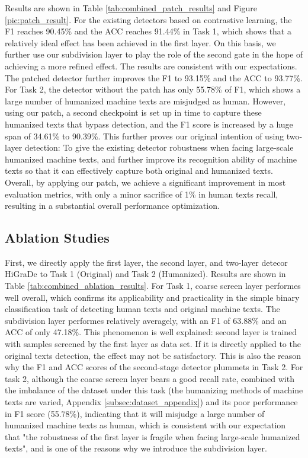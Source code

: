 \documentclass[11pt]{article}
\begin{document}
				Results are shown in Table \ref{tab:combined_patch_results} and Figure \ref{pic:patch_result}. For the existing detectors based on contrastive learning, the F1 reaches 90.45\% and the ACC reaches 91.44\% in Task 1, which shows that a relatively ideal effect has been achieved in the first layer. On this basis, we further use our subdivision layer to play the role of the second gate in the hope of achieving a more refined effect. The results are consistent with our expectations. The patched detector further improves the F1 to 93.15\% and the ACC to 93.77\%. For Task 2, the detector without the patch has only 55.78\% of F1, which shows a large number of humanized machine texts are misjudged as human. However, using our patch, a second checkpoint is set up in time to capture these humanized texts that bypass detection, and the F1 score is increased by a huge span of 34.61\% to 90.39\%. This further proves our original intention of using two-layer detection: To give the existing detector robustness when facing large-scale humanized machine texts, and further improve its recognition ability of machine texts so that it can effectively capture both original and humanized texts. Overall, by applying our patch, we achieve a significant improvement in most evaluation metrics, with only a minor sacrifice of 1\% in human texts recall, resulting in a substantial overall performance optimization.
	
	\subsection{Ablation Studies}
		 First, we directly apply the first layer, the second layer, and two-layer detecor HiGraDe to Task 1 (Original) and Task 2 (Humanized). Results are shown in Table \ref{tab:combined_ablation_results}. For Task 1, coarse screen layer performes well overall, which confirms its applicability and practicality in the simple binary classification task of detecting human texts and original machine texts. The subdivision layer performes relatively averagely, with an F1 of 63.88\% and an ACC of only 47.18\%. This phenomenon is well explained: second layer is trained with samples screened by the first layer as data set. If it is directly applied to the original texts detection, the effect may not be satisfactory. This is also the reason why the F1 and ACC scores of the second-stage detector plummets in Task 2. For task 2, although the coarse screen layer bears a good recall rate, combined with the imbalance of the dataset under this task (the humanizing methods of machine texts are varied, Appendix \ref{subsec:dataset_appendix}) and its poor performance in F1 score (55.78\%), indicating that it will misjudge a large number of humanized machine texts as human, which is consistent with our expectation that "the robustness of the first layer is fragile when facing large-scale humanized texts", and is one of the reasons why we introduce the subdivision layer.
\end{document}
